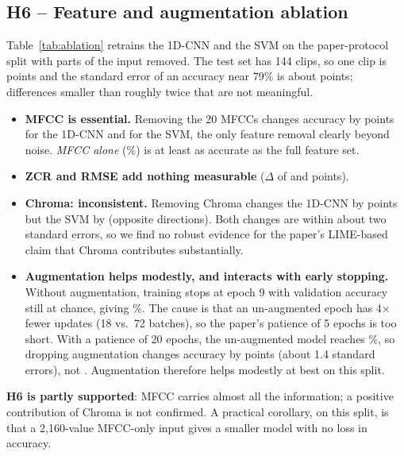 \subsection{H6 -- Feature and augmentation ablation}
\label{sec:ablation}
Table~\ref{tab:ablation} retrains the 1D-CNN and the SVM on the paper-protocol split with parts of the input removed.
The test set has 144 clips, so one clip is \AblClipPct{} points and the standard error of an accuracy near 79\%
is about \AblSE{} points; differences smaller than roughly twice that are not meaningful.

\begin{table}[t]
\centering
\caption{Ablation on the paper-protocol split (accuracy \%, 144 test clips). $\Delta$ is relative to the full
1D-CNN (79.2\%). *Training stopped at epoch 9 with validation accuracy at chance level (see text).}
\label{tab:ablation}
\footnotesize\setlength{\tabcolsep}{3pt}
\resizebox{\columnwidth}{!}{}
\end{table}

\begin{itemize}
  \item \textbf{MFCC is essential.} Removing the 20 MFCCs changes accuracy by \AblNomfcc{} points for the 1D-CNN and
        \AblSvmNomfcc{} for the SVM, the only feature removal clearly beyond noise. \emph{MFCC alone}
        (\AblAccMfcconly\%) is at least as accurate as the full feature set.
  \item \textbf{ZCR and RMSE add nothing measurable} ($\Delta$ of \AblNozcr{} and \AblNorms{} points).
  \item \textbf{Chroma: inconsistent.} Removing Chroma changes the 1D-CNN by \AblNochroma{} points but
        the SVM by \AblSvmNochroma{} (opposite directions). Both changes are within about two standard errors, so we find no
        robust evidence for the paper's LIME-based claim that Chroma contributes substantially.
  \item \textbf{Augmentation helps modestly, and interacts with early stopping.} Without augmentation, training
        stops at epoch 9 with validation accuracy still at chance, giving \AblAccNoaugmentation\%. The cause is that an
        un-augmented epoch has 4$\times$ fewer updates (18 vs.\ 72 batches), so the paper's patience of 5 epochs is
        too short. With a patience of 20 epochs, the un-augmented model reaches \AblAccNoaugmentationpatiencetwenty\%,
        so dropping augmentation changes accuracy by \AblNoaugmentationpatiencetwenty{} points (about 1.4 standard
        errors), not \AblNoaugmentation. Augmentation therefore helps modestly at best on this split.
\end{itemize}
\textbf{H6 is partly supported}: MFCC carries almost all the information; a positive contribution of Chroma is not
confirmed. A practical corollary, on this split, is that a 2,160-value MFCC-only input gives a smaller model with no loss in
accuracy.

